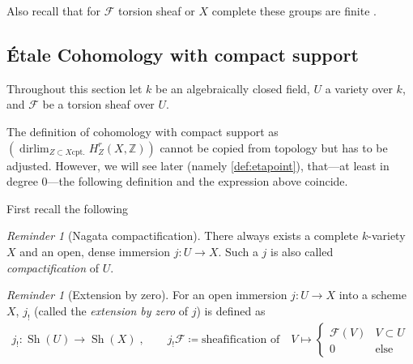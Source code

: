\documentclass[english]{scrartcl}
\theoremstyle{definition}
\theoremstyle{remark}
\newtheorem{Rev}[Def]{Reminder}
\newcommand*{\Z}{\mathds{Z}}
\newcommand*{\F}{\mathcal{F}} %
\DeclareMathOperator*{\dirlim}{dirlim} %
\DeclareMathOperator{\Sh}{Sh} %
\begin{document}
Also recall that for $\F$ torsion sheaf or $X$ complete these groups
are finite \cite[][Thm.~I.19.1]{milne}.

\subsection{Étale Cohomology with compact support}
Throughout this section let $k$ be an algebraically closed field,
$U$ a variety over $k$,
and $\F$ be a torsion sheaf over $U$.

The definition of cohomology with compact support as
$\left(\dirlim_{Z\subset X \text{cpt.}}H_Z^r(X,\Z)\right)$
cannot be copied from topology but has to be adjusted.
However, we will see later (namely \autoref{def:etapoint}),
that---at least in degree 0---the following definition
and the expression above coincide.

First recall the following
\begin{Rev}[Nagata compactification]\label{nagata}
  There always exists a complete $k$-variety $X$ and an open, dense
  immersion $j\colon U\to X$. Such a $j$ is also called
  \emph{compactification} of $U$.
\end{Rev}
\begin{Rev}[Extension by zero]\label{def:extbyzero}
  For an open immersion $j\colon U\to X$ into
  a scheme $X$, $j_!$ (called the \emph{extension by zero} of $j$)
  is defined as
  \begin{gather*}
    j_!\colon \Sh(U)\to \Sh(X)\;,\qquad
    j_!\F \coloneqq \text{sheafification of}\quad
    V\mapsto\begin{cases}
      \F(V) & V\subset U\\
      0     & \text{else}
    \end{cases}
  \end{gather*}
\end{Rev}
\end{document}
